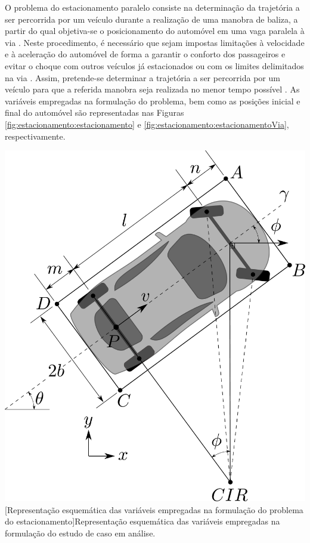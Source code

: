 
O problema do estacionamento paralelo consiste na determinação da trajetória a ser percorrida por um veículo durante a realização de uma manobra de baliza, a partir do qual objetiva-se o posicionamento do automóvel em uma vaga paralela à via \cite{paromtchik_autonomous_1996}. Neste procedimento, é necessário que sejam impostas limitações à velocidade e à aceleração do automóvel de forma a garantir o conforto dos passageiros e evitar o choque com outros veículos já estacionados ou com os limites delimitados na via \cite{li_time-optimal_2016}. Assim, pretende-se determinar a trajetória a ser percorrida por um veículo para que a referida manobra seja realizada no menor tempo possível \cite{li_time-optimal_2016}. As variáveis empregadas na formulação do problema, bem como as posições inicial e final do automóvel são representadas nas Figuras \ref{fig:estacionamento:estacionamento} e \ref{fig:estacionamento:estacionamentoVia}, respectivamente.

\noindent	
\begin{minipage}{\textwidth}
	\vspace{\onelineskip}
	\centering
	\includegraphics[scale=0.14]{draw/resultados/pdf/estacionamento}
	[Representação esquemática das variáveis empregadas na formulação do problema do estacionamento]{Representação esquemática das variáveis empregadas na formulação do estudo de caso em análise.}
	\label{fig:estacionamento:estacionamento}
	\vspace{\onelineskip}
\end{minipage}

